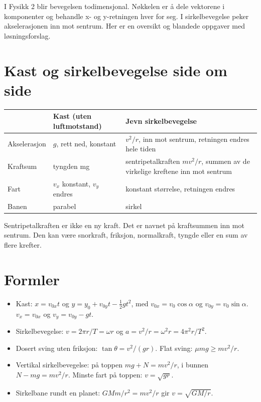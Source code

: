 \documentclass[11pt]{article}
\begin{document}

I Fysikk 2 blir bevegelsen todimensjonal. Nøkkelen er å dele vektorene i komponenter og behandle x- og y-retningen hver for seg. I sirkelbevegelse peker akselerasjonen inn mot sentrum. Her er en oversikt og blandede oppgaver med løsningsforslag.

\section*{Kast og sirkelbevegelse side om side}

\begin{center}\small
\begin{tabularx}{\linewidth}{YYY}
\toprule
\textbf{} & \textbf{Kast (uten luftmotstand)} & \textbf{Jevn sirkelbevegelse} \\
\midrule
Akselerasjon & $g$, rett ned, konstant & $v^{2}/r$, inn mot sentrum, retningen endres hele tiden \\
Kraftsum & tyngden mg & sentripetalkraften $mv^{2}/r$, summen av de virkelige kreftene inn mot sentrum \\
Fart & $v_{x}$ konstant, $v_{y}$ endres & konstant størrelse, retningen endres \\
Banen & parabel & sirkel \\
\bottomrule
\end{tabularx}
\end{center}

Sentripetalkraften er ikke en ny kraft. Det er navnet på kraftsummen inn mot sentrum. Den kan være snorkraft, friksjon, normalkraft, tyngde eller en sum av flere krefter.

\section*{Formler}

\begin{itemize}
\item Kast: $x = v_{0x}t$ og $y = y_{0} + v_{0y}t - \tfrac{1}{2}gt^{2}$, med $v_{0x} = v_{0} \cos  α$ og $v_{0y} = v_{0} \sin  α$. $v_{x} = v_{0x}$ og $v_{y} = v_{0y} - gt$.
\item Sirkelbevegelse: $v = 2πr/T = ωr$ og $a = v^{2}/r = ω^{2}r = 4π^{2}r/T^{2}$.
\item Dosert sving uten friksjon: $\tan  θ = v^{2}/(gr)$. Flat sving: $μmg \geq mv^{2}/r$.
\item Vertikal sirkelbevegelse: på toppen $mg + N = mv^{2}/r$, i bunnen $N - mg = mv^{2}/r$. Minste fart på toppen: $v = \sqrt{gr}$.
\item Sirkelbane rundt en planet: $GMm/r^{2} = mv^{2}/r$ gir $v = \sqrt{GM/r}$.
\end{itemize}
\end{document}
